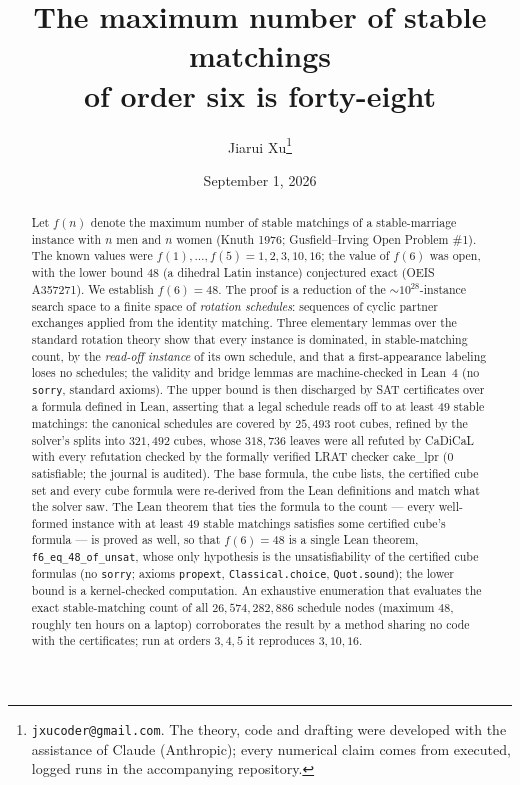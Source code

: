 \documentclass[11pt]{article}
\title{The maximum number of stable matchings\\ of order six is forty-eight}
\author{Jiarui Xu\thanks{\texttt{jxucoder@gmail.com}. The theory, code and drafting were developed with
the assistance of Claude (Anthropic); every numerical claim comes from executed, logged runs in the
accompanying repository.}}
\date{September 1, 2026}
\begin{document}
\maketitle

\begin{abstract}
Let $f(n)$ denote the maximum number of stable matchings of a stable-marriage instance with $n$ men
and $n$ women (Knuth 1976; Gusfield--Irving Open Problem \#1). The known values were
$f(1),\dots,f(5)=1,2,3,10,16$; the value of $f(6)$ was open, with the lower bound $48$ (a dihedral
Latin instance) conjectured exact (OEIS A357271). We establish $f(6)=48$. The proof is a reduction
of the $\sim\!10^{28}$-instance search space to a finite space of \emph{rotation schedules}:
sequences of cyclic partner exchanges applied from the identity matching. Three elementary lemmas
over the standard rotation theory show that every instance is dominated, in stable-matching count,
by the \emph{read-off instance} of its own schedule, and that a first-appearance labeling loses no
schedules; the validity and bridge lemmas are machine-checked in Lean~4 (no \texttt{sorry},
standard axioms). The upper bound is then discharged by SAT certificates over a formula defined in
Lean, asserting that a legal schedule reads off to at least $49$ stable matchings: the canonical
schedules are covered by $25{,}493$ root cubes, refined by the solver's splits into $321{,}492$
cubes, whose $318{,}736$ leaves were all refuted by CaDiCaL with every refutation checked by the
formally verified LRAT checker cake\_lpr ($0$ satisfiable; the journal is audited). The base
formula, the cube lists, the certified cube set and every cube formula were re-derived from the
Lean definitions and match what the solver saw. The Lean theorem that ties the formula to the
count --- every well-formed instance with at least $49$ stable matchings satisfies some certified
cube's formula --- is proved as well, so that $f(6)=48$ is a single Lean theorem,
\texttt{f6\_eq\_48\_of\_unsat}, whose only hypothesis is the unsatisfiability of the certified
cube formulas (no \texttt{sorry}; axioms \texttt{propext}, \texttt{Classical.choice},
\texttt{Quot.sound}); the lower bound is a kernel-checked computation.
An exhaustive enumeration that evaluates the exact stable-matching count of all
$26{,}574{,}282{,}886$ schedule nodes (maximum $48$, roughly ten hours on a laptop) corroborates the
result by a method sharing no code with the certificates; run at orders $3,4,5$ it reproduces
$3,10,16$.
\end{abstract}
\end{document}

